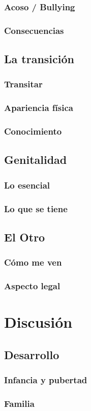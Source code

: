 \subsubsection{Acoso / Bullying}

\subsubsection{Consecuencias}

\subsection{La transición}

\subsubsection{Transitar}

\subsubsection{Apariencia física}

\subsubsection{Conocimiento}

\subsection{Genitalidad}

\subsubsection{Lo esencial}

\subsubsection{Lo que se tiene}

\subsection{El Otro}

\subsubsection{Cómo me ven}

\subsubsection{Aspecto legal}

\section{Discusión}\label{sec:discusion}

\subsection{Desarrollo}

\subsubsection{Infancia y pubertad}

\subsubsection{Familia}
